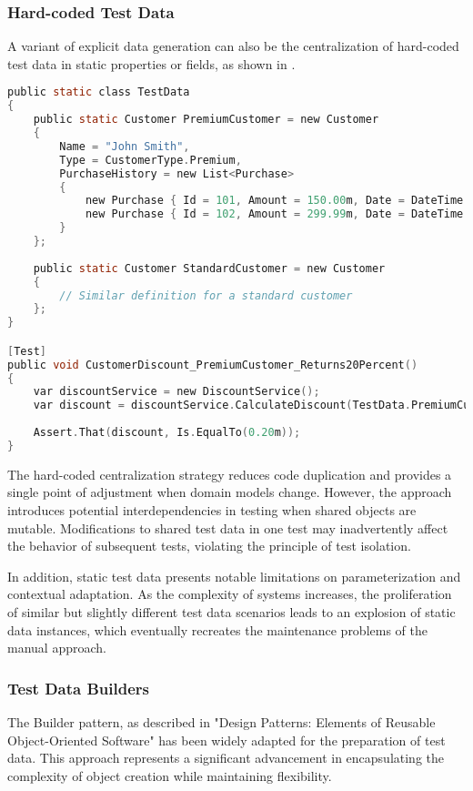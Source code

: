\subsubsection{Hard-coded Test Data}
A variant of explicit data generation can also be the centralization of hard-coded test data in static properties or fields, as shown in .
\begin{lstlisting}[language=C, caption=Hard-coded Test Data, label={lst:hard}]
public static class TestData
{
    public static Customer PremiumCustomer = new Customer
    {
        Name = "John Smith",
        Type = CustomerType.Premium,
        PurchaseHistory = new List<Purchase>
        {
            new Purchase { Id = 101, Amount = 150.00m, Date = DateTime.Now.AddDays(-5) },
            new Purchase { Id = 102, Amount = 299.99m, Date = DateTime.Now.AddDays(-2) }
        }
    };
    
    public static Customer StandardCustomer = new Customer
    {
        // Similar definition for a standard customer
    };
}

[Test]
public void CustomerDiscount_PremiumCustomer_Returns20Percent()
{
    var discountService = new DiscountService();
    var discount = discountService.CalculateDiscount(TestData.PremiumCustomer);
    
    Assert.That(discount, Is.EqualTo(0.20m));
}
\end{lstlisting}
The  hard-coded centralization strategy reduces code duplication and provides a single point of adjustment when domain models change. However, the approach introduces potential interdependencies in testing when shared objects are mutable. Modifications to shared test data in one test may inadvertently affect the behavior of subsequent tests, violating the principle of test isolation.

In addition, static test data presents notable limitations on parameterization and contextual adaptation. As the complexity of systems increases, the proliferation of similar but slightly different test data scenarios leads to an explosion of static data instances, which eventually recreates the maintenance problems of the manual approach.
\subsubsection{Test Data Builders}
The Builder pattern, as described in "Design Patterns: Elements of Reusable Object-Oriented Software" \cite{Gamma1994} has been widely adapted for the preparation of test data. This approach represents a significant advancement in encapsulating the complexity of object creation while maintaining flexibility.

